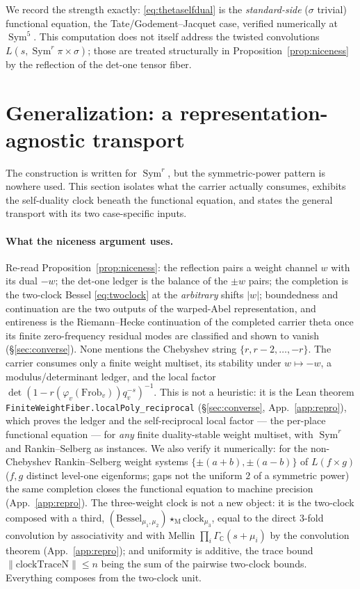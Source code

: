 \documentclass[11pt]{article}
\theoremstyle{definition}
\newcommand{\Sym}{\operatorname{Sym}}
\begin{document}
We record the strength exactly: \eqref{eq:thetaselfdual} is the \emph{standard-side} ($\sigma$ trivial)
functional equation, the Tate/Godement--Jacquet case, verified numerically at $\Sym^5$. This computation
does not itself address the twisted convolutions $L(s,\Sym^r\pi\times\sigma)$; those are treated
structurally in Proposition~\ref{prop:niceness} by the reflection of the det-one tensor fiber.

\section{Generalization: a representation-agnostic transport}\label{sec:general}

The construction is written for $\Sym^r$, but the symmetric-power pattern is nowhere used. This section
isolates what the carrier actually consumes, exhibits the self-duality clock beneath the functional
equation, and states the general transport with its two case-specific inputs.

\paragraph{What the niceness argument uses.} Re-read Proposition~\ref{prop:niceness}: the reflection
pairs a weight channel $w$ with its dual $-w$; the det-one ledger is the balance of the $\pm w$ pairs;
the completion is the two-clock Bessel \eqref{eq:twoclock} at the \emph{arbitrary} shifts $|w|$;
boundedness and continuation are the two outputs of the warped-Abel representation, and entireness is the
Riemann--Hecke continuation of the completed carrier theta once its finite zero-frequency residual modes
are classified and shown to vanish (\S\ref{sec:converse}). None mentions the
Chebyshev string $\{r,r-2,\dots,-r\}$. The carrier consumes only a finite weight multiset, its stability
under $w\mapsto-w$, a modulus/determinant ledger, and the local factor
$\det(1-r(\varphi_v(\mathrm{Frob}_v))q_v^{-s})^{-1}$. This is not a heuristic: it is the Lean theorem
\texttt{FiniteWeightFiber.localPoly\_reciprocal} (\S\ref{sec:converse}, App.~\ref{app:repro}), which proves
the ledger and the self-reciprocal local factor --- the per-place functional equation --- for \emph{any}
finite duality-stable weight multiset, with $\Sym^r$ and Rankin--Selberg as instances. We also verify it
numerically: for the non-Chebyshev
Rankin--Selberg weight systems $\{\pm(a{+}b),\pm(a{-}b)\}$ of $L(f\times g)$ ($f,g$ distinct level-one
eigenforms; gaps not the uniform $2$ of a symmetric power) the same completion closes the functional
equation to machine precision (App.~\ref{app:repro}). The three-weight clock is not a new object: it is
the two-clock composed with a third, $(\text{Bessel}_{\mu_1,\mu_2})\star_{\mathrm M}\text{clock}_{\mu_3}$,
equal to the direct $3$-fold convolution by associativity and with Mellin $\prod_i\Gamma_{\mathbb C}(s+
\mu_i)$ by the convolution theorem (App.~\ref{app:repro}); and uniformity is additive, the trace bound
$\|\mathrm{clockTraceN}\|\le n$ being the sum of the pairwise two-clock bounds. Everything composes from
the two-clock unit.
\end{document}
